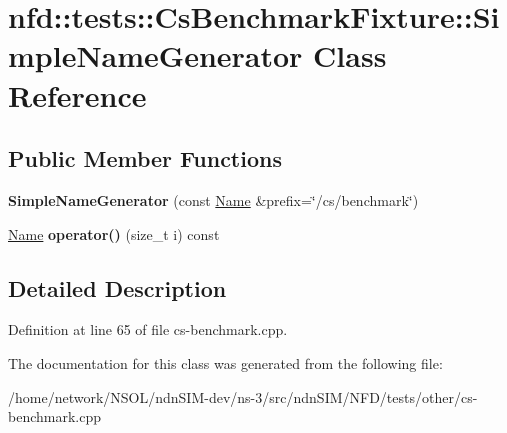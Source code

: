 \hypertarget{classnfd_1_1tests_1_1CsBenchmarkFixture_1_1SimpleNameGenerator}{}\section{nfd\+:\+:tests\+:\+:Cs\+Benchmark\+Fixture\+:\+:Simple\+Name\+Generator Class Reference}
\label{classnfd_1_1tests_1_1CsBenchmarkFixture_1_1SimpleNameGenerator}
\subsection*{Public Member Functions}
\begin{DoxyCompactItemize}
\item 
{\bfseries Simple\+Name\+Generator} (const \hyperlink{classndn_1_1Name}{Name} \&prefix=\char`\"{}/cs/benchmark\char`\"{})\hypertarget{classnfd_1_1tests_1_1CsBenchmarkFixture_1_1SimpleNameGenerator_ac24a5ea4a4ff480fb0506a284b5da7e3}{}\label{classnfd_1_1tests_1_1CsBenchmarkFixture_1_1SimpleNameGenerator_ac24a5ea4a4ff480fb0506a284b5da7e3}

\item 
\hyperlink{classndn_1_1Name}{Name} {\bfseries operator()} (size\+\_\+t i) const\hypertarget{classnfd_1_1tests_1_1CsBenchmarkFixture_1_1SimpleNameGenerator_a7b46150e90566621824045fe052b3ca1}{}\label{classnfd_1_1tests_1_1CsBenchmarkFixture_1_1SimpleNameGenerator_a7b46150e90566621824045fe052b3ca1}

\end{DoxyCompactItemize}


\subsection{Detailed Description}


Definition at line 65 of file cs-\/benchmark.\+cpp.



The documentation for this class was generated from the following file\+:\begin{DoxyCompactItemize}
\item 
/home/network/\+N\+S\+O\+L/ndn\+S\+I\+M-\/dev/ns-\/3/src/ndn\+S\+I\+M/\+N\+F\+D/tests/other/cs-\/benchmark.\+cpp\end{DoxyCompactItemize}

